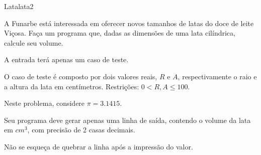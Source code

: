 \documentclass[12pt,a4paper,oneside]{article}
\begin{document}
\begin{problem}{Lata}{lata}{2}

A Funarbe está interessada em oferecer novos tamanhos de latas do doce de leite Viçosa.  
Faça um programa que, dadas as dimensões de uma lata cilíndrica, calcule seu volume.

%

\InputFile

A entrada terá apenas um caso de teste.

O caso de teste é composto por dois valores reais, $R$ e $A$, respectivamente o raio e a altura da lata em centímetros. Restrições: $0 < R,A \leq 100$.

\Notes
Neste problema, considere $\pi = 3.1415$.


\OutputFile

Seu programa deve gerar apenas uma linha de saída, contendo o volume da lata em $cm^3$, com precisão de 2 casas decimais.

Não se esqueça de quebrar a linha após a impressão do valor.

\Example

\begin{example}
%
\end{example}

\begin{example}
%
\end{example}

\begin{example}
%
\end{example}



\end{problem}
\end{document}
